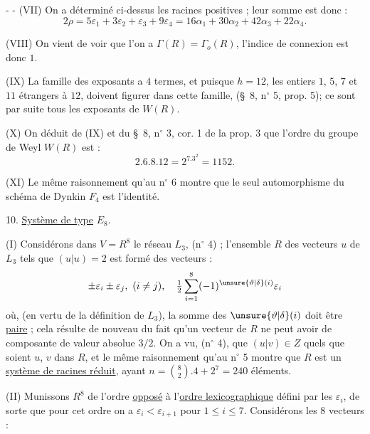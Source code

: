 -  -
(VII) On a déterminé ci-dessus les racines positives ; leur somme est donc :
\[
2\rho=5\varepsilon_1+3\varepsilon_2+\varepsilon_3+9\varepsilon_4
=16\alpha_1+30\alpha_2+42\alpha_3+22\alpha_4.
\]

(VIII) On vient de voir que l'on a $\Gamma(R)=\Gamma_o(R)$, l'indice de connexion est donc $1$.

(IX) La famille des exposants a $4$ termes, et puisque $h=12$, les entiers $1$, $5$, $7$ et $11$ étrangers à $12$, doivent figurer dans cette famille, (\S\ 8, n$^\circ$ 5, prop. 5); ce sont par suite tous les exposants de $W(R)$.

(X) On déduit de (IX) et du \S\ 8, n$^\circ$ 3, cor. 1 de la prop. 3 que l'ordre du groupe de Weyl $W(R)$ est :
\[
2.6.8.12=2^7.3^2=1152.
\]

(XI) Le même raisonnement qu'au n$^\circ$ 6 montre que le seul automorphisme du schéma de Dynkin $F_4$ est l'identité.

10. \uline{Système de type} $E_8$.

(I) Considérons dans $V=R^8$ le réseau $L_3$, (n$^\circ$ 4) ; l'ensemble $R$ des vecteurs $u$ de $L_3$ tels que $(u|u)=2$ est formé des vecteurs :
\[
\pm\varepsilon_i\pm\varepsilon_j,\ (i\ne j),\quad
\tfrac12\sum_{i=1}^{8}(-1)^{\unsure{\vartheta|\delta}(i)}\varepsilon_i
\]
où, (en vertu de la définition de $L_3$), la somme des $\unsure{\vartheta|\delta}(i)$ doit être \uline{paire} ; cela résulte de nouveau du fait qu'un vecteur de $R$ ne peut avoir de composante de valeur absolue $3/2$. On a vu, (n$^\circ$ 4), que $(u|v)\in Z$ quels que soient $u$, $v$ dans $R$, et le même raisonnement qu'au n$^\circ$ 5 montre que $R$ est un \uline{système de racines réduit}, ayant $n=\binom82.4+2^7=240$ éléments.

(II) Munissons $R^8$ de l'ordre \uline{opposé} à l'\uline{ordre lexicographique} défini par les $\varepsilon_i$, de sorte que pour cet ordre on a $\varepsilon_i<\varepsilon_{i+1}$ pour $1\leq i\leq7$. Considérons les $8$ vecteurs :
